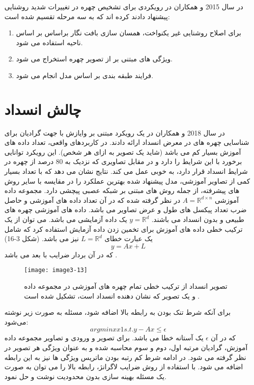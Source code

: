 \noindent‏
در سال 2015  و همکاران در \cite{HUSSAINSHAH201597} رویکردی برای تشخیص چهره در تغییرات شدید روشنایی پیشنهاد دادند کرده اند که به سه مرحله تقسیم شده است:
\begin{enumerate}
\item
	برای اصلاح روشنایی غیر یکنواخت، همسان سازی بافت نگار براساس بر اساس ناحیه استفاده می شود.
\item 
	ویژگی های مبتنی بر  از تصویر چهره استخراج  می شود.
\item
فرایند طبقه بندی بر اساس مدل  انجام می شود.
\end{enumerate}
	
\section{چالش انسداد}
در سال 2018  و همکاران در \cite{WU2018256} یک رویکرد مبتنی بر وايازش  با جهت گرادیان برای شناسایی چهره های در معرض انسداد ارائه دادند. در کاربردهای واقعی، تعداد داده های آموزش بسیار کم می باشد (شاید یک تصویر به ازای هر شخص). این رویکرد توانایی برخورد با این شرایط را دارد و در مقابل تصاویری که نزدیک به 80 درصد از چهره در شرایط انسداد قرار دارد، به خوبی عمل می کند. نتایج نشان می دهد که با تعداد بسیار کمی از تصاویر آموزشی، مدل پیشنهاد شده  بهترین عملکرد را در مقایسه با سایر روش های پیشرفته، از جمله روش های مبتنی بر شبکه عصبی پیچشی دارد. 
مجموعه داده  آموزشی
$A=\mathbb{R}^{d\times n}$
در نظر گرفته شده که در آن  تعداد داده های آموزشی و  حاصل ضرب تعداد پیکسل های طول و عرض تصاویر می باشد. داده های آموزشی چهره های طبیعی و بدون انسداد می باشند.
$y=\mathbb{R}^d$
یک داده آزمایشی می باشد. می توان از یک ترکیب خطی داده های آموزش برای تخمین زدن داده آزمایش استفاده کرد که شامل یک عبارت خطای
$L=\mathbb{R}^d$
نیز می باشد. (شکل 3-16) 
\begin{equation}\label{eq3-11}
y=Ax+L
\end{equation}
\noindent‏
که در آن  بردار ضرایب با  بعد می باشد.
 \begin{figure}[h]
\centering
  \texttt{[image: image3-13]}
  \caption{تصویر انسداد از ترکیب خطی تمام چهره های آموزشی در مجموعه داده و یک تصویر  که نشان دهنده انسداد است، تشکیل شده است \cite{ref1}.}
  \label{image2-1}
\end{figure}
\noindent
برای آنکه شرط تنک بودن به رابطه بالا اضافه شود، مسئله به صورت زیر نوشته می‌شود:
\begin{equation}\label{eq3-12}
argminxx1   s.t.y-Ax≤ϵ	
\end{equation}
\noindent‏
که در آن
$\epsilon$
یک آستانه خطا می باشد. برای تصویر و ورودی و تصاویر مجموعه داده آموزش، گرادیان مرتبه اول، دوم و سوم محاسبه شده و به عنوان ویژگی هر تصویر در نظر گرفته می شود. در ادامه شرط کم رتبه بودن ماتریس ویژگی ها نیز به این رابطه اضافه می شود. با استفاده از روش ضرایب لاگرانژ، رابطه بالا را می توان به صورت یک مسئله بهینه سازی بدون محدودیت نوشت و حل نمود.

